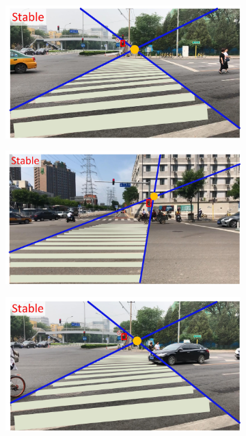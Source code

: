 \begin{figure}[ht!]
\begin{center}
\begin{subfigure}[h]{0.48\linewidth}
 \includegraphics[width=1.\linewidth]{figure/zebra1.jpg}
 \caption{}
 \label{fig:zebra1}
 \end{subfigure}
 \begin{subfigure}[h]{0.48\linewidth}
  \includegraphics[width=1.\linewidth]{figure/zebra2.jpg}
  \caption{}
  \label{fig:zebra2}
  \end{subfigure}
   \begin{subfigure}[h]{0.48\linewidth}
  \includegraphics[width=1.\linewidth]{figure/zebra3.jpg}

\end{subfigure}
\end{center}
\end{figure}
